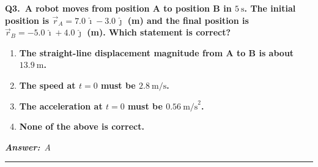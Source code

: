 \documentclass[11pt]{article}
\newcommand{\QuestionStyle}[1]{{\large\bfseries\boldmath #1}}
\newcommand{\AnswerStyle}[1]{{\large\bfseries\boldmath #1}}
\newcommand{\ReasonStyle}[1]{{\normalsize #1}}
\newif\ifshowreason
\newcommand{\Correct}[2]{%
  \item \AnswerStyle{\textcolor{AnsRed}{#1}}%
  \ifshowreason\\[-0.2em]
    \ReasonStyle{\textcolor{AnsRed}{#2}}%
  \fi
}
\newcommand{\Wrong}[2]{%
  \item \AnswerStyle{\textcolor{WrongBlue}{#1}}%
  \ifshowreason\\[-0.2em]
    \ReasonStyle{\textcolor{WrongBlue}{#2}}%
  \fi
}
\newcommand{\QBlock}[4]{%
  \Needspace{8\baselineskip}%
  \noindent
  \begin{minipage}{\linewidth}
    \QuestionStyle{#1.~#2}

    \vspace{0.25em}
    \begin{enumerate}
      #3
    \end{enumerate}

    \vspace{0.1em}
    \noindent\textcolor{AnsRed}{\textit{\textbf{Answer:}~#4}}

    \vspace{0.25em}
    \hrule height 0.4pt
  \end{minipage}
  \vspace{0.75em}
}
\begin{document}
\QBlock{Q3}{A robot moves from position A to position B in $5\ \text{s}$. The initial position is $\vec r_A=7.0\,\hat{\imath}-3.0\,\hat{\jmath}$ (m) and the final position is $\vec r_B=-5.0\,\hat{\imath}+4.0\,\hat{\jmath}$ (m). Which statement is correct?}{
  \Correct{The straight-line displacement magnitude from A to B is about $13.9\ \text{m}$.}{Compute displacement $\Delta\vec r=\vec r_B-\vec r_A = (-5-7)\hat\imath+(4-(-3))\hat\jmath = -12\hat\imath+7\hat\jmath$. Its magnitude is $|\Delta\vec r|=\sqrt{(-12)^2+7^2}=\sqrt{193}\approx 13.9\ \text{m}$, so this statement is correct.}
  \Wrong{The speed at $t=0$ must be $2.8\ \text{m/s}$.}{$|\Delta\vec r|/\Delta t\approx 13.9/5\approx 2.8\ \text{m/s}$ is the magnitude of the average velocity (or an average speed only if it moved straight at constant speed). The initial speed $v(0)$ is not determined by just the endpoints and total time.}
  \Wrong{The acceleration at $t=0$ must be $0.56\ \text{m/s}^2$.}{This incorrectly invents an acceleration from endpoint data (e.g., dividing an average speed by time). Without additional constraints (like constant acceleration plus known initial velocity), $\vec a(0)$ cannot be uniquely determined.}
  \Wrong{None of the above is correct.}{Option A is correct because it uses the displacement magnitude $|\Delta\vec r|=\sqrt{193}\approx 13.9\ \text{m}$. Therefore it is not true that none of the statements is correct.}
}{A}
\end{document}
